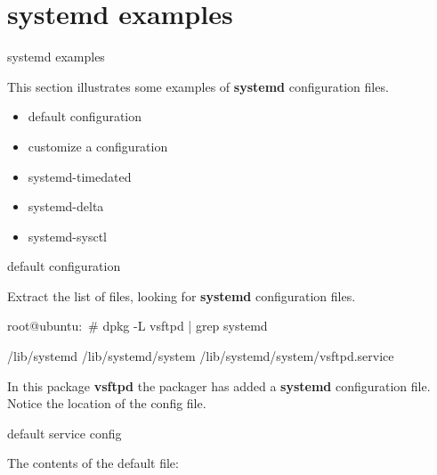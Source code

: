 \section{systemd examples} 

\begin{frame}
	{systemd examples}
 
	This section illustrates some examples of 
	\textbf{systemd} configuration files. 
\begin{itemize}
                        \item   default configuration
                        \item   customize a configuration 

                        \item   systemd-timedated
                        \item   systemd-delta
                        \item   systemd-sysctl
                \end{itemize}
\end{frame} 

\cprotect\note{ 

}

\begin{frame}
	{default configuration}

	Extract the list of files, looking for \textbf{systemd} 
	configuration files. 

\begin{raw}

root@ubuntu:~# dpkg -L vsftpd  | grep systemd 

/lib/systemd
/lib/systemd/system
/lib/systemd/system/vsftpd.service

\end{raw}

	In this package \textbf{vsftpd} the packager has added 
	a \textbf{systemd} configuration file. \\

	Notice the location of the config file. 

\end{frame}

\cprotect\note{


}

\begin{frame}
	{default service config}

	The contents of the default file: 




\end{frame}

